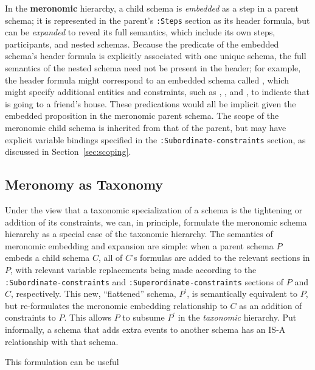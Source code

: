 In the \textbf{meronomic} hierarchy, a child schema is \textit{embedded} as a step in a parent schema; it is represented in the parent's \texttt{:Steps} section as its header formula, but can be \textit{expanded} to reveal its full semantics, which include its own steps, participants, and nested schemas.
Because the predicate of the embedded schema's header formula is explicitly associated with one unique schema, the full semantics of the nested schema need not be present in the header; for example, the header formula  might correspond to an embedded schema called , which might specify additional entities and constraints, such as , , and , to indicate that  is going to a friend's house. These predications would all be implicit given the embedded  proposition in the meronomic parent schema.
The scope of the meronomic child schema is inherited from that of the parent, but may have explicit variable bindings specified in the \texttt{:Subordinate-constraints} section, as discussed in Section~\ref{sec:scoping}.

\subsection{Meronomy as Taxonomy}
Under the view that a taxonomic specialization of a schema is the tightening or addition of its constraints, we can, in principle, formulate the meronomic schema hierarchy as a special case of the taxonomic hierarchy. The semantics of meronomic embedding and expansion are simple: when a parent schema $P$ embeds a child schema $C$, all of $C$'s formulas are added to the relevant sections in $P$, with relevant variable replacements being made according to the \texttt{:Subordinate-constraints} and \texttt{:Superordinate-constraints} sections of $P$ and $C$, respectively. This new, ``flattened'' schema, $P^{\prime}$, is semantically equivalent to $P$, but re-formulates the meronomic embedding relationship to $C$ as an addition of constraints to $P$. This allows $P$ to subsume $P^{\prime}$ in the \textit{taxonomic} hierarchy. Put informally, a schema that adds extra events to another schema has an IS-A relationship with that schema.

This formulation can be useful 